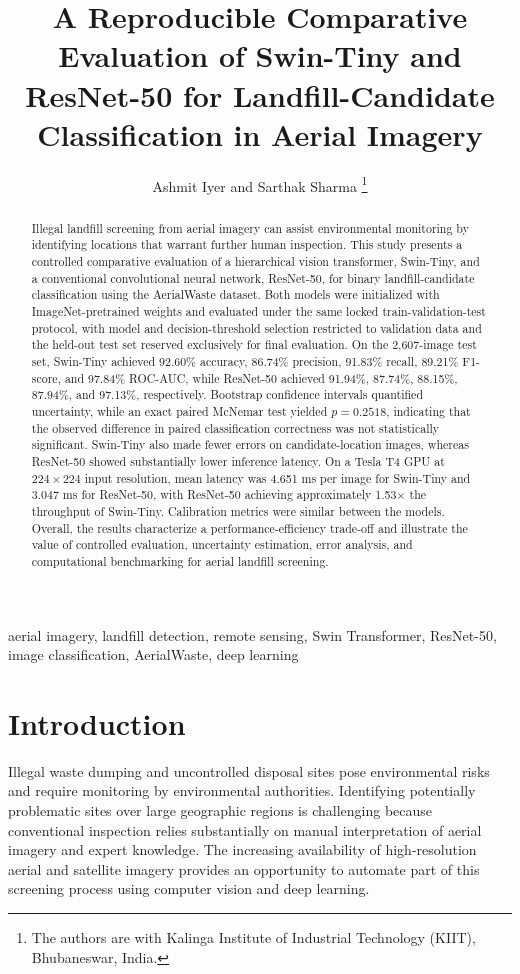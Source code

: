 \documentclass[journal]{IEEEtran}
\title{A Reproducible Comparative Evaluation of Swin-Tiny and ResNet-50 for Landfill-Candidate Classification in Aerial Imagery}
\author{Ashmit Iyer and Sarthak Sharma%
\thanks{The authors are with Kalinga Institute of Industrial Technology (KIIT), Bhubaneswar, India.}
}
\begin{document}
\maketitle

\begin{abstract}
Illegal landfill screening from aerial imagery can assist environmental monitoring by identifying locations that warrant further human inspection. This study presents a controlled comparative evaluation of a hierarchical vision transformer, Swin-Tiny, and a conventional convolutional neural network, ResNet-50, for binary landfill-candidate classification using the AerialWaste dataset. Both models were initialized with ImageNet-pretrained weights and evaluated under the same locked train-validation-test protocol, with model and decision-threshold selection restricted to validation data and the held-out test set reserved exclusively for final evaluation. On the 2,607-image test set, Swin-Tiny achieved 92.60\% accuracy, 86.74\% precision, 91.83\% recall, 89.21\% F1-score, and 97.84\% ROC-AUC, while ResNet-50 achieved 91.94\%, 87.74\%, 88.15\%, 87.94\%, and 97.13\%, respectively. Bootstrap confidence intervals quantified uncertainty, while an exact paired McNemar test yielded $p=0.2518$, indicating that the observed difference in paired classification correctness was not statistically significant. Swin-Tiny also made fewer errors on candidate-location images, whereas ResNet-50 showed substantially lower inference latency. On a Tesla T4 GPU at $224\times224$ input resolution, mean latency was 4.651 ms per image for Swin-Tiny and 3.047 ms for ResNet-50, with ResNet-50 achieving approximately 1.53$\times$ the throughput of Swin-Tiny. Calibration metrics were similar between the models. Overall, the results characterize a performance-efficiency trade-off and illustrate the value of controlled evaluation, uncertainty estimation, error analysis, and computational benchmarking for aerial landfill screening.
\end{abstract}

\begin{IEEEkeywords}
aerial imagery, landfill detection, remote sensing, Swin Transformer, ResNet-50, image classification, AerialWaste, deep learning
\end{IEEEkeywords}

\section{Introduction}
Illegal waste dumping and uncontrolled disposal sites pose environmental risks and require monitoring by environmental authorities. Identifying potentially problematic sites over large geographic regions is challenging because conventional inspection relies substantially on manual interpretation of aerial imagery and expert knowledge. The increasing availability of high-resolution aerial and satellite imagery provides an opportunity to automate part of this screening process using computer vision and deep learning.
\end{document}
